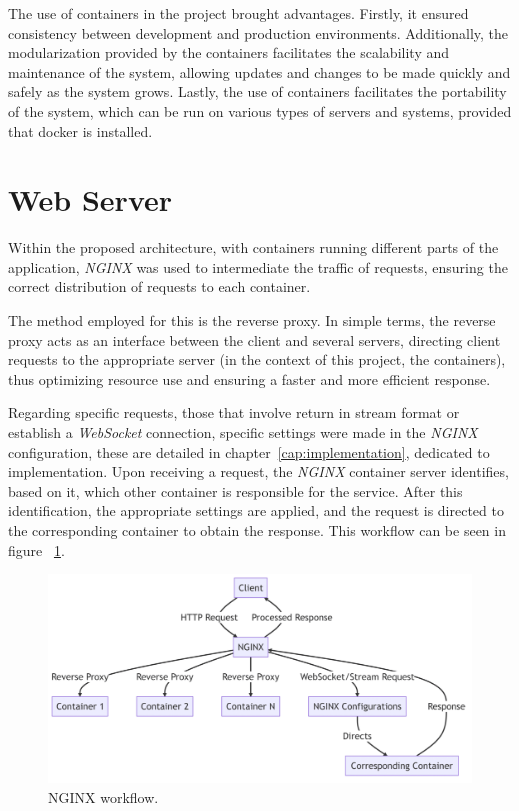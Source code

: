 The use of containers in the project brought advantages. Firstly, it ensured consistency between development and production environments. Additionally, the modularization provided by the containers facilitates the scalability and maintenance of the system, allowing updates and changes to be made quickly and safely as the system grows. Lastly, the use of containers facilitates the portability of the system, which can be run on various types of servers and systems, provided that docker is installed.


\section{Web Server}\label{sec:webserver}

Within the proposed architecture, with containers running different parts of the application, \textit{NGINX} \cite{nginxDocs} was used to intermediate the traffic of requests, ensuring the correct distribution of requests to each container.

The method employed for this is the reverse proxy. In simple terms, the reverse proxy acts as an interface between the client and several servers, directing client requests to the appropriate server (in the context of this project, the containers), thus optimizing resource use and ensuring a faster and more efficient response.

Regarding specific requests, those that involve return in stream format or establish a \textit{WebSocket} connection, specific settings were made in the \textit{NGINX} configuration, these are detailed in chapter~\ref{cap:implementation}, dedicated to implementation. Upon receiving a request, the \textit{NGINX} container server identifies, based on it, which other container is responsible for the service. After this identification, the appropriate settings are applied, and the request is directed to the corresponding container to obtain the response. This workflow can be seen in figure ~\ref{fig:nginx_workflow}.

\begin{figure}[htbp]
	\centering
	\includegraphics[scale=0.2]{images/diagrama_nginx.png}
	\caption{NGINX workflow.}
	\label{fig:nginx_workflow}
\end{figure}

